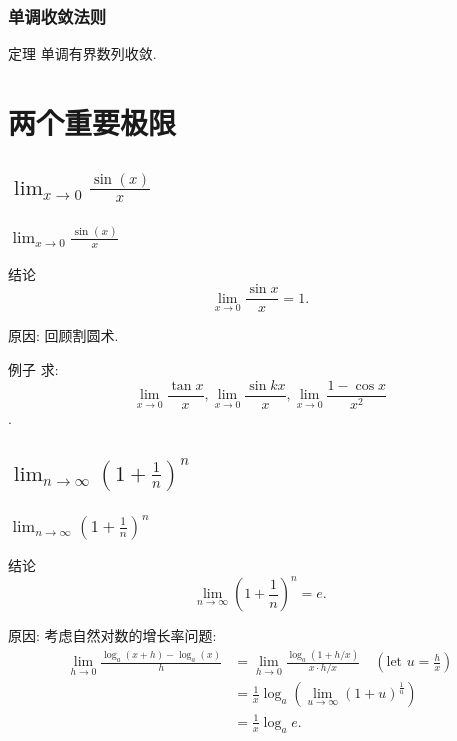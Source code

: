 \documentclass[
10pt,  
aspectratio=43,  
]{beamer}
\begin{document}
\begin{frame}
	\frametitle{单调收敛法则}
	\begin{block}{定理}
		单调有界数列收敛.
	\end{block}
	
\end{frame}

\section{两个重要极限}
\subsection{$\lim_{x\to0}\frac{\sin(x)}{x}$}

\begin{frame}
	\frametitle{$\lim_{x\to0}\frac{\sin(x)}{x}$}
	\begin{block}{结论}
		$$
		\lim _{x \rightarrow 0} \frac{\sin x}{x}=1.
		$$
	\end{block}
	原因: 回顾割圆术.
	
	\begin{exampleblock}{例子}
		求:  $$\displaystyle\lim _{x \rightarrow 0} \frac{\tan x}{x},   \lim_{x \rightarrow 0} \frac{\sin k x}{x},   \lim _{x\rightarrow 0} \frac{1-\cos x}{x^2}$$.
	\end{exampleblock}
	
\end{frame}

\subsection{$\lim_{n\to\infty}\left(1+\frac1n\right)^n$}

\begin{frame}
	\frametitle{$\lim_{n\to\infty}\left(1+\frac1n\right)^n$}
	\begin{block}{结论}
		$$
		\lim _{n \rightarrow \infty}\left(1+\frac{1}{n}\right)^n=e.
		$$
	\end{block}
	原因: 考虑自然对数的增长率问题: 
	\begin{equation*}
		\begin{aligned}
			\lim _{h \rightarrow 0} \frac{\log _a(x+h)-\log _a(x)}{h} & =\lim _{h \rightarrow 0} \frac{\log _a(1+h / x)}{x \cdot h / x} \quad (\text{let } u=\frac{h}{x})             \\
			& =\frac{1}{x} \log _a\left(\lim _{u \rightarrow \infty}(1+u)^{\frac{1}{u}}\right) \\
			& =\frac{1}{x}\log_ae.                                                     
		\end{aligned}
	\end{equation*}
\end{frame}
\end{document}
